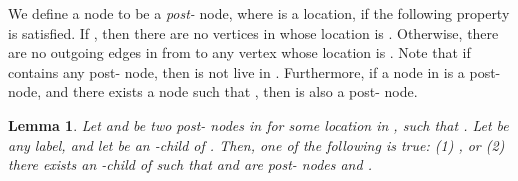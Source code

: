 \documentclass[11pt]{article}
\numberwithin{theorem}{section}
\newtheorem{lemma}[theorem]{Lemma}
\begin{document}
We define a node  to be a \emph{post-} node, where  is a location,  if the following property is satisfied. If , then there are no vertices in  whose location is . Otherwise, there are no outgoing edges in  from  to any vertex whose location is . Note that if  contains any post- node, then  is not live in . Furthermore, if a node  in  is a post- node, and there exists a node  such that , then  is also a post- node.
 
 \begin{lemma}\label{lem:similarModuloChild}
 Let  and  be two post- nodes in  for some location  in , such that . Let  be any label, and let
  be an -child of . Then, one of the following is true: (1) , or (2) there exists an -child  of  such that  and  are post- nodes and .
\end{lemma}
\end{document}
